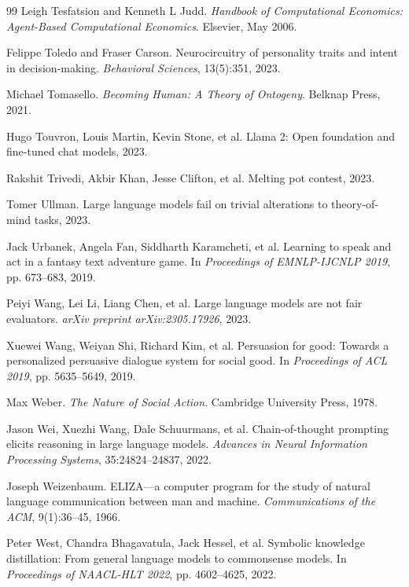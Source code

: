 \documentclass[11pt,a4paper]{article}
\begin{document}
\begin{thebibliography}{99}
Leigh Tesfatsion and Kenneth L Judd. \textit{Handbook of Computational Economics: Agent-Based Computational Economics}. Elsevier, May 2006.

Felippe Toledo and Fraser Carson. Neurocircuitry of personality traits and intent in decision-making. \textit{Behavioral Sciences}, 13(5):351, 2023.

Michael Tomasello. \textit{Becoming Human: A Theory of Ontogeny}. Belknap Press, 2021.

Hugo Touvron, Louis Martin, Kevin Stone, et al. Llama 2: Open foundation and fine-tuned chat models, 2023.

Rakshit Trivedi, Akbir Khan, Jesse Clifton, et al. Melting pot contest, 2023.

Tomer Ullman. Large language models fail on trivial alterations to theory-of-mind tasks, 2023.

Jack Urbanek, Angela Fan, Siddharth Karamcheti, et al. Learning to speak and act in a fantasy text adventure game. In \textit{Proceedings of EMNLP-IJCNLP 2019}, pp. 673--683, 2019.

Peiyi Wang, Lei Li, Liang Chen, et al. Large language models are not fair evaluators. \textit{arXiv preprint arXiv:2305.17926}, 2023.

Xuewei Wang, Weiyan Shi, Richard Kim, et al. Persuasion for good: Towards a personalized persuasive dialogue system for social good. In \textit{Proceedings of ACL 2019}, pp. 5635--5649, 2019.

Max Weber. \textit{The Nature of Social Action}. Cambridge University Press, 1978.

Jason Wei, Xuezhi Wang, Dale Schuurmans, et al. Chain-of-thought prompting elicits reasoning in large language models. \textit{Advances in Neural Information Processing Systems}, 35:24824--24837, 2022.

Joseph Weizenbaum. ELIZA---a computer program for the study of natural language communication between man and machine. \textit{Communications of the ACM}, 9(1):36--45, 1966.

Peter West, Chandra Bhagavatula, Jack Hessel, et al. Symbolic knowledge distillation: From general language models to commonsense models. In \textit{Proceedings of NAACL-HLT 2022}, pp. 4602--4625, 2022.


\end{thebibliography}
\end{document}
